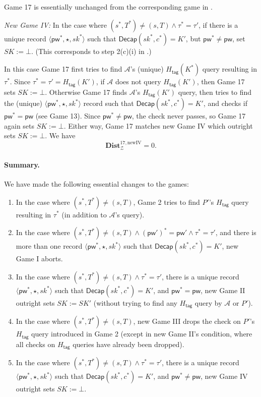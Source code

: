 \documentclass{article}
\theoremstyle{plain}
\theoremstyle{definition}
\theoremstyle{remark}
\newcommand{\adv}{\mathcal{A}}
\newcommand{\env}{\mathcal{Z}}
\newcommand{\Dist}{\mathbf{Dist}}
\newcommand{\Decap}{\mathsf{Decap}}
\newcommand{\Htag}{H_\mathsf{tag}}
\newcommand{\pw}{\mathsf{pw}}
\begin{document}
Game 17 is essentially unchanged from the corresponding game in .

\medskip\noindent\emph{New Game IV:} In the case where $(s^*,T^*) \neq (s,T) \land \tau^* = \tau'$, if there is a unique record $\langle\pw^*,\star,sk^*\rangle$ such that $\Decap(sk^*,c^*) = K'$, but $\pw^* \neq \pw$, set $SK := \bot$. (This corresponds to step 2(c)(i) in .)

In this case Game 17 first tries to find $\adv$'s (unique) $\Htag(K^*)$ query resulting in $\tau^*$. Since $\tau^* = \tau' = \Htag(K')$, if $\adv$ does not query $\Htag(K')$, then Game 17 sets $SK := \bot$. Otherwise Game 17 finds $\adv$'s $\Htag(K')$ query, then tries to find the (unique) $\langle\pw^*,\star,sk^*\rangle$ record such that $\Decap(sk^*,c^*) = K'$, and checks if $\pw^* = \pw$ (see Game 13). Since $\pw^* \neq \pw$, the check never passes, so Game 17 again sets $SK := \bot$. Either way, Game 17 matches new Game IV which outright sets $SK := \bot$. We have
\[
\Dist_\env^{17,\text{newIV}} = 0.
\]

\paragraph{Summary.}
We have made the following essential changes to the games:
\begin{enumerate}
  \item In the case where $(s^*,T^*) \neq (s,T)$, Game 2 tries to find $P'$'s $\Htag$ query resulting in $\tau^*$ (in addition to $\adv$'s query).
  \item In the case where $(s^*,T^*) \neq (s,T) \land (\pw')^* = \pw' \land \tau^* = \tau'$, and there is more than one record $\langle\pw^*,\star,sk^*\rangle$ such that $\Decap(sk^*,c^*) = K'$, new Game I aborts.
  \item In the case where $(s^*,T^*) \neq (s,T) \land \tau^* = \tau'$, there is a unique record $\langle\pw^*,\star,sk^*\rangle$ such that $\Decap(sk^*,c^*) = K'$, and $\pw^* = \pw$, new Game II outright sets $SK := SK'$ (without trying to find any $\Htag$ query by $\adv$ or $P'$).
  \item In the case where $(s^*,T^*) \neq (s,T)$, new Game III drops the check on $P'$'s $\Htag$ query introduced in Game 2 (except in new Game II's condition, where all checks on $\Htag$ queries have already been dropped).
  \item In the case where $(s^*,T^*) \neq (s,T) \land \tau^* = \tau'$, there is a unique record $\langle\pw^*,\star,sk^*\rangle$ such that $\Decap(sk^*,c^*) = K'$, and $\pw^* \neq \pw$, new Game IV outright sets $SK := \bot$.
\end{enumerate}
\end{document}
